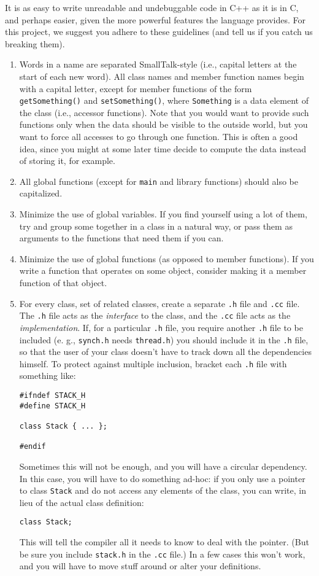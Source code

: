 It is as easy to write unreadable and undebuggable code in C++ as it
is in C, and perhaps easier, given the more powerful features the
language provides.  For this project, we suggest you adhere to these
guidelines (and tell us if you catch us breaking them).

\begin{enumerate}
\item Words in a name are separated SmallTalk-style (i.e., capital
letters at the start of each new word).  All class names and member
function names begin with a capital letter, except for member
functions of the form {\tt getSomething()} and {\tt setSomething()},
where {\tt Something} is a data element of the class (i.e., accessor
functions).  Note that you would want to provide such functions only
when the data should be visible to the outside world, but you want to
force all accesses to go through one function.  This is often a good
idea, since you might at some later time decide to compute the data
instead of storing it, for example.
\item All global functions (except for {\tt main} and library
functions) should also be capitalized.
\item Minimize the use of global variables.  If you find yourself
using a lot of them, try and group some together in a class in a
natural way, or pass them as arguments to the functions that need them
if you can.
\item Minimize the use of global functions (as opposed to member
functions).  If you write a function that operates on some object,
consider making it a member function of that object.
\item For every class, set of related classes, create a separate
{\tt .h} file and {\tt .cc} file. The {\tt .h} file acts as the {\it
interface} to the class, and the {\tt .cc} file acts as the
{\it implementation}.  If, for a particular {\tt .h} file, you require
another {\tt .h} file to be included (e. g., {\tt synch.h} needs
{\tt thread.h}) you should include it in the {\tt .h} file, so that
the user of your class doesn't have to track down all the dependencies
himself.  To protect against multiple inclusion, bracket each {\tt .h}
file with something like:
\begin{verbatim}
#ifndef STACK_H
#define STACK_H

class Stack { ... };

#endif
\end{verbatim}
Sometimes this will not be enough, and you will have a circular
dependency.  In this case, you will have to do something ad-hoc: if
you only use a pointer to class {\tt Stack} and do not access any
elements of the class, you can write, in lieu of the actual class
definition:
\begin{verbatim}
class Stack;
\end{verbatim}
This will tell the compiler all it
needs to know to deal with the pointer.  (But be sure you include
{\tt stack.h} in the {\tt .cc} file.)  In a few cases this won't work,
and you will have to move stuff around or alter your definitions.

\end{enumerate}

